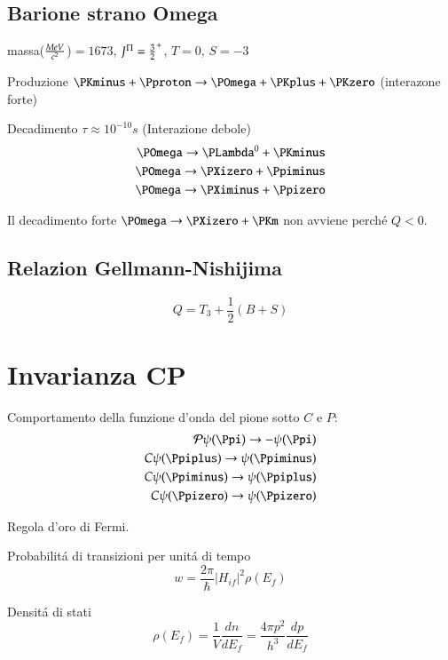 \documentclass[main.tex]{subfiles}
\begin{document}
\subsection{Barione strano Omega}

\begin{itemize*}
\item massa($\frac{MeV}{c^2}$)$=1673$, $J^{\Pi}=\frac{3}{2}^+$, $T=0$, $S=-3$
\item Produzione
$\PKminus+\Pproton\rightarrow\POmega+\PKplus+\PKzero$ (interazone forte)

\item Decadimento
 $\tau\approx10^{-10}s$ (Interazione debole)
\begin{align*}
\POmega\rightarrow\PLambda^0+\PKminus\\
\POmega\rightarrow\PXizero+\Ppiminus\\
\POmega\rightarrow\PXiminus+\Ppizero
\end{align*}

Il decadimento forte $\POmega\to\PXizero+\PKm$ non avviene perch\'e $Q<0$.
\end{itemize*}

\subsection{Relazion Gellmann-Nishijima}
\begin{equation*}
Q=T_3+\frac{1}{2}(B+S)
\end{equation*}

\section{Invarianza CP}

\begin{enumerate*}
\item Comportamento della funzione d'onda del pione sotto $C$ e $P$:
\begin{align*}
\PO\psi(\Ppi)\to-\psi(\Ppi)\\
C\psi(\Ppiplus)\to\psi(\Ppiminus)\\
C\psi(\Ppiminus)\to\psi(\Ppiplus)\\
C\psi(\Ppizero)\to\psi(\Ppizero)
\end{align*}

\item Regola d'oro di Fermi.

Probabilit\'a di transizioni per unit\'a di tempo
\begin{equation*}
w=\frac{2\pi}{\hbar}|H_{if}|^2\rho(E_f)
\end{equation*}

\item Densit\'a di stati
\begin{equation*}
\rho(E_f)=\frac{1}{V}\frac{dn}{dE_f}=\frac{4\pi p^2}{h^3}\frac{dp}{dE_f}
\end{equation*}

\end{enumerate*}
\end{document}
